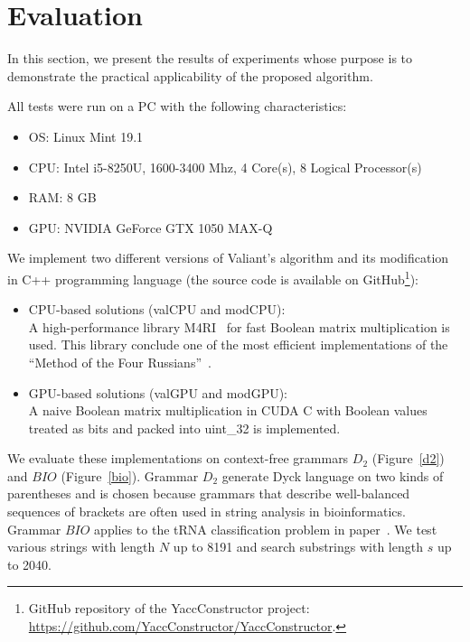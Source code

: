 \section{Evaluation}

In this section, we present the results of experiments whose purpose is to demonstrate the practical applicability of the proposed algorithm.

All tests were run on a PC with the following characteristics:
\begin{itemize}
    \item OS: Linux Mint 19.1
    \item CPU: Intel i5-8250U, 1600-3400 Mhz, 4 Core(s), 8 Logical Processor(s)
    \item RAM: 8 GB
    \item GPU: NVIDIA GeForce GTX 1050 MAX-Q
\end{itemize}

We implement two different versions of Valiant's algorithm and its modification in C++ programming language (the source code is available on GitHub\footnote{GitHub repository of the YaccConstructor project: \url{https://github.com/YaccConstructor/YaccConstructor}.}):

\begin{itemize}
    \item CPU-based solutions (valCPU and modCPU): \\
    A high-performance library M4RI~\cite{Albrecht_2010} for fast Boolean matrix multiplication is used. This library conclude one of the most efficient implementations of the “Method of the Four Russians”~\cite{arlazarov1970economical}.
    \item GPU-based solutions (valGPU and modGPU): \\
    A naive Boolean matrix multiplication in CUDA C with Boolean values treated as bits and packed into uint\_32 is implemented.
\end{itemize}


We evaluate these implementations on context-free grammars $D_2$ (Figure~\ref{d2}) and $BIO$ (Figure~\ref{bio}).
Grammar $D_2$ generate Dyck language on two kinds of parentheses and is chosen because grammars that describe well-balanced sequences of brackets are often used in string analysis in bioinformatics. 
Grammar $BIO$ applies to the tRNA classification problem in paper~\cite{bioinformatics19}.
We test various strings with length $N$ up to 8191 and search substrings with length $s$ up to 2040.

